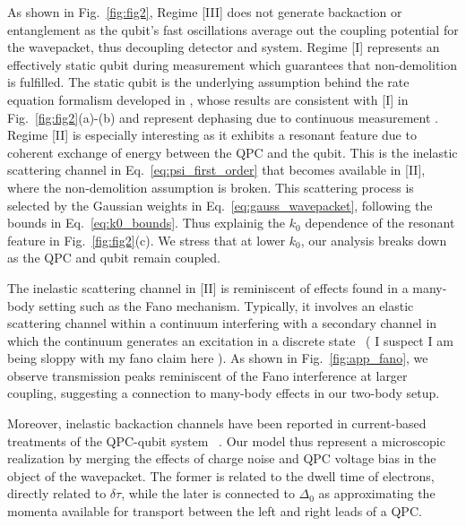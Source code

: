 \documentclass[10pt,
 amsmath,amssymb,
 aps,prb, twocolumn
]{revtex4-2}
\newcommand\sj[1]{ {\color{cyan} #1} }
\begin{document}
\sj{As shown in Fig.~\ref{fig:fig2}, Regime [III] does not generate backaction or entanglement as the qubit's fast oscillations average out the coupling potential for the wavepacket, thus decoupling detector and system. Regime [I] represents an effectively static qubit during measurement which guarantees that non-demolition is fulfilled. The static qubit is the underlying assumption behind the rate equation formalism developed in \cite{gurvitz1996, gurvitz1997,gurvitzQuantumDescriptionClassical2003, gurvitzZeno2003}, whose results are consistent with [I] in Fig.~\eqref{fig:fig2}(a)-(b) and represent dephasing due to continuous measurement \cite{korotkovMeasurementDoubleDot1999}. Regime [II] is especially interesting as it exhibits a resonant feature due to coherent exchange of energy between the QPC and the qubit. This is the inelastic scattering channel in Eq.~\eqref{eq:psi_first_order} that becomes available in [II], where the non-demolition assumption is broken. This scattering process is selected by the Gaussian weights in Eq.~\eqref{eq:gauss_wavepacket}, following the bounds in Eq.~\eqref{eq:k0_bounds}. Thus explainig the \mbox{$k_0$} dependence of the resonant feature in Fig.~\eqref{fig:fig2}(c). We stress that at lower $k_0$, our analysis breaks down as the QPC and qubit remain coupled.}

\sj{The inelastic scattering channel in [II] is reminiscent of effects found in a many-body setting such as the Fano mechanism.} Typically, it involves an elastic scattering channel within a continuum interfering with a secondary channel in which the continuum generates an excitation in a discrete state~\cite{kobayashiFano2004, reyesFano2017} (\sj{I suspect I am being sloppy with my fano claim here}). As shown in Fig.~\ref{fig:app_fano}, we observe transmission peaks reminiscent of the Fano interference at larger coupling, suggesting a connection to many-body effects in our two-body setup.

Moreover, inelastic backaction channels have been reported in current-based treatments of the QPC-qubit system ~\cite{ouyangBackaction2010, youngInelasticBackaction2010, chudnovskiyDoubleDot2009}. Our model thus represent a microscopic realization by merging the effects of charge noise and QPC voltage bias in the object of the wavepacket. The former is related to the dwell time of electrons, directly related to \mbox{$\delta \tau$}, while the later is connected to $\Delta_0$ as approximating the momenta available for transport between the left and right leads of a QPC.
\end{document}
